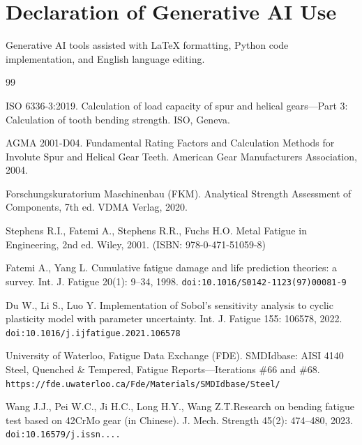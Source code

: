 \documentclass[twocolumn,12pt,a4paper]{article}
\begin{document}
\section*{Declaration of Generative AI Use}

Generative AI tools assisted with LaTeX formatting, Python code
implementation, and English language editing.

\begin{thebibliography}{99}

ISO 6336-3:2019. Calculation of load capacity of spur and helical
gears---Part 3: Calculation of tooth bending strength. ISO, Geneva.

AGMA 2001-D04. Fundamental Rating Factors and Calculation Methods for
Involute Spur and Helical Gear Teeth. American Gear Manufacturers
Association, 2004.

Forschungskuratorium Maschinenbau (FKM). Analytical Strength Assessment
of Components, 7th ed. VDMA Verlag, 2020.

Stephens R.I., Fatemi A., Stephens R.R., Fuchs H.O. Metal Fatigue in
Engineering, 2nd ed. Wiley, 2001. (ISBN: 978-0-471-51059-8)

Fatemi A., Yang L. Cumulative fatigue damage and life prediction
theories: a survey. Int. J. Fatigue 20(1): 9--34, 1998.
\texttt{doi:10.1016/S0142-1123(97)00081-9}

Du W., Li S., Luo Y. Implementation of Sobol's sensitivity analysis to
cyclic plasticity model with parameter uncertainty. Int. J. Fatigue
155: 106578, 2022.
\texttt{doi:10.1016/j.ijfatigue.2021.106578}

University of Waterloo, Fatigue Data Exchange (FDE). SMDIdbase: AISI
4140 Steel, Quenched \& Tempered, Fatigue Reports---Iterations \#66 and
\#68. \texttt{https://fde.uwaterloo.ca/\allowbreak Fde/Materials/\allowbreak SMDIdbase/Steel/}

Wang J.J., Pei W.C., Ji H.C., Long H.Y., Wang Z.T.\allowbreak Research on bending
fatigue test based on 42CrMo gear (in Chinese). J. Mech. Strength
45(2): 474--480, 2023.
\texttt{doi:10.16579/j.\allowbreak issn....}


\end{thebibliography}
\end{document}
